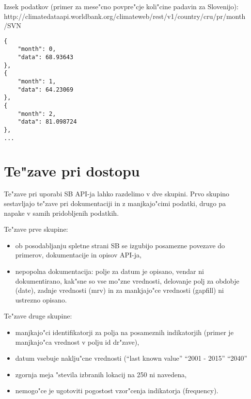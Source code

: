 Izsek podatkov (primer za mese"cno povpre"cje koli"cine padavin za Slovenijo):
http://climatedataapi.worldbank.org/climateweb/rest/v1/country/cru/pr/month/SVN

\begin{lstlisting}
{
    "month": 0,
    "data": 68.93643
},
{
    "month": 1,
    "data": 64.23069
},
{
    "month": 2,
    "data": 81.098724
},
...
\end{lstlisting}











\section{Te"zave pri dostopu}


Te"zave pri uporabi SB API-ja lahko razdelimo v dve skupini. Prvo skupino
sestavljajo te"zave pri dokumentaciji in z manjkajo"cimi podatki, drugo pa
napake v samih pridobljenih podatkih.

Te"zave prve skupine:

\begin{itemize}  
\item ob posodabljanju spletne strani SB se izgubijo posamezne povezave do 
  primerov, dokumentacije in opisov API-ja,
\item nepopolna dokumentacija:
\subitem polje za datum je opisano, vendar ni dokumentirano, kak"sne so vse mo"zne 
    vrednosti,
\subitem delovanje polj za obdobje (date), zadnje vrednosti (mrv) in za mankjajo"ce
    vrednosti (gapfill) ni ustrezno opisano.
\end{itemize}  

Te"zave druge skupine:


\begin{itemize}  
\item manjkajo"ci identifikatorji za polja na posameznih indikatorjih (primer je
  manjkajo"ca vrednost v polju id dr"zave),
\item datum vsebuje naklju"cne vrednosti (``last known value'' ``2001 - 2015'' ``2040''
\item zgornja meja "stevila izbranih lokacij na 250 ni navedena,
\item nemogo"ce je ugotoviti pogostost vzor"cenja indikatorja (frequency).
\end{itemize}  







